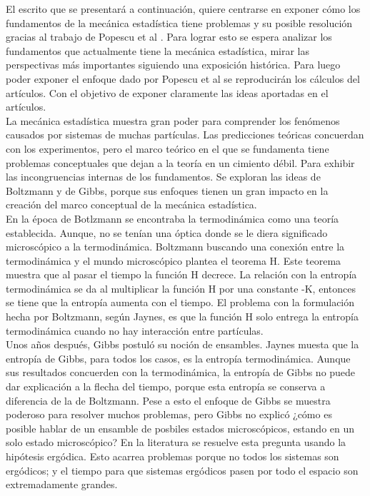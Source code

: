 El escrito que se presentará a continuación, quiere centrarse en exponer cómo los fundamentos de la mecánica estadística tiene problemas y su posible resolución gracias al trabajo de Popescu et al \cite{Popescu2006}. Para lograr esto se espera analizar los fundamentos que actualmente tiene la mecánica estadística, mirar las perspectivas más importantes siguiendo una exposición histórica. Para luego poder exponer el enfoque dado por Popescu et al se reproducirán los cálculos del artículos. Con el objetivo de exponer claramente las ideas aportadas en el artículos.
\\
La mecánica estadística muestra gran poder para comprender los fenómenos causados por sistemas de muchas partículas. Las predicciones teóricas concuerdan con los experimentos, pero el marco teórico en el que se fundamenta tiene problemas conceptuales que dejan a la teoría en un cimiento débil.  Para exhibir las incongruencias internas de los fundamentos. Se exploran las ideas de Boltzmann y de Gibbs, porque sus enfoques tienen un gran impacto en la creación del marco conceptual de la mecánica estadística.
\\ 
En la época de Botlzmann se encontraba la termodinámica como una teoría establecida. Aunque, no se tenían una óptica donde se le diera significado microscópico a la termodinámica. Boltzmann buscando una conexión entre la termodinámica y  el mundo microscópico plantea el teorema H. Este teorema muestra que al pasar el tiempo la función H decrece. La relación con la entropía termodinámica se da al multiplicar la función H por una constante -K, entonces se tiene que la entropía aumenta con el tiempo. El problema con la formulación hecha por Boltzmann, según Jaynes, es que la función H solo entrega la entropía termodinámica  cuando no hay interacción entre partículas.
\\
Unos años después, Gibbs postuló su noción de ensambles. Jaynes muesta que la entropía de Gibbs, para todos los casos, es la entropía termodinámica. Aunque sus resultados concuerden con la termodinámica, la entropía de Gibbs no puede dar explicación a la flecha del tiempo, porque esta entropía se conserva a diferencia de la de Boltzmann. Pese a esto el enfoque de Gibbs se muestra poderoso para resolver muchos problemas, pero Gibbs no explicó ¿cómo es posible hablar de un ensamble de posbiles estados microscópicos, estando en un solo estado microscópico? En la literatura se resuelve esta pregunta usando la hipótesis ergódica. Esto acarrea problemas porque no todos los sistemas son ergódicos; y el tiempo para que sistemas ergódicos pasen por todo el espacio son extremadamente grandes. 
